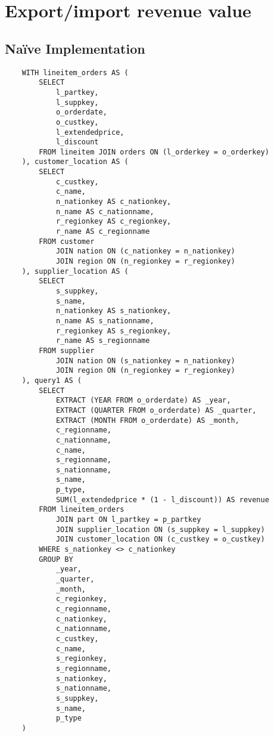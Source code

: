 

\section{Export/import revenue value}

\subsection{Na\"{i}ve Implementation}

\begin{lstlisting}
	WITH lineitem_orders AS (
		SELECT 
			l_partkey, 
			l_suppkey, 
			o_orderdate, 
			o_custkey, 
			l_extendedprice, 
			l_discount
		FROM lineitem JOIN orders ON (l_orderkey = o_orderkey)
	), customer_location AS (
		SELECT 
			c_custkey, 
			c_name, 
			n_nationkey AS c_nationkey, 
			n_name AS c_nationname, 
			r_regionkey AS c_regionkey, 
			r_name AS c_regionname 
		FROM customer 
			JOIN nation ON (c_nationkey = n_nationkey)
			JOIN region ON (n_regionkey = r_regionkey)
	), supplier_location AS (
		SELECT 
			s_suppkey, 
			s_name, 
			n_nationkey AS s_nationkey, 
			n_name AS s_nationname, 
			r_regionkey AS s_regionkey, 
			r_name AS s_regionname 
		FROM supplier 
			JOIN nation ON (s_nationkey = n_nationkey)
			JOIN region ON (n_regionkey = r_regionkey)
	), query1 AS (
		SELECT
			EXTRACT (YEAR FROM o_orderdate) AS _year,
			EXTRACT (QUARTER FROM o_orderdate) AS _quarter,
			EXTRACT (MONTH FROM o_orderdate) AS _month,
			c_regionname,
			c_nationname,
			c_name,
			s_regionname,
			s_nationname,
			s_name,
			p_type,
			SUM(l_extendedprice * (1 - l_discount)) AS revenue
		FROM lineitem_orders 
			JOIN part ON l_partkey = p_partkey
			JOIN supplier_location ON (s_suppkey = l_suppkey)
			JOIN customer_location ON (c_custkey = o_custkey)
		WHERE s_nationkey <> c_nationkey
		GROUP BY
			_year,
			_quarter,
			_month,
			c_regionkey,
			c_regionname,
			c_nationkey,
			c_nationname,
			c_custkey,
			c_name,
			s_regionkey,
			s_regionname,
			s_nationkey,
			s_nationname,
			s_suppkey,
			s_name,
			p_type
	) 
\end{lstlisting}